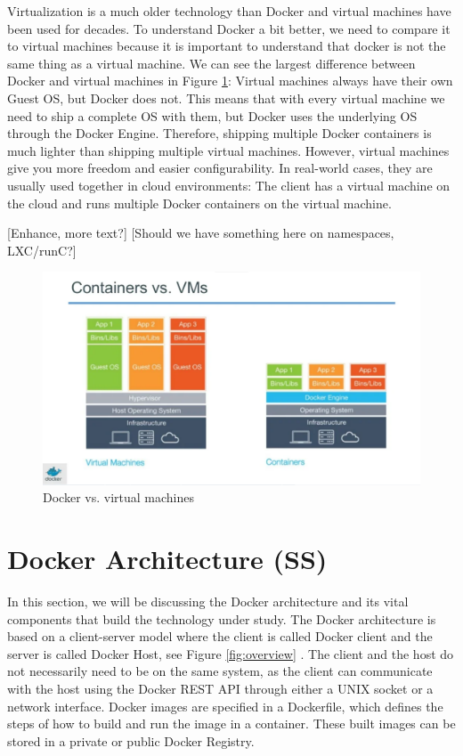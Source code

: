 \documentclass[fleqn,12pt]{olplainarticle}
\begin{document}
Virtualization is a much older technology than Docker and virtual machines have been used for decades. To understand Docker a bit better, we need to compare
it to virtual machines because it is important to understand that docker is not the same thing as a virtual machine. We can see the largest difference between Docker and virtual machines in Figure \ref{fig:dockervsvm}: Virtual machines always have their own Guest OS, but Docker does not. This means that with every virtual machine we need to ship a complete OS with them, but Docker uses the underlying OS through the Docker Engine. Therefore, shipping multiple Docker containers is much lighter than shipping multiple virtual machines. However, virtual machines give you more freedom and easier configurability. In real-world cases, they are usually used together in cloud environments: The client has a virtual machine on the cloud and runs multiple Docker containers on the virtual machine.

[Enhance, more text?]
[Should we have something here on namespaces, LXC/runC?]

\begin{figure}[h]
    \centering
    \includegraphics[width=1\textwidth]{docker_vs_vm.png}
    \caption{Docker vs. virtual machines \cite{docker:vs_vm}}
    \label{fig:dockervsvm}
\end{figure}

\section{Docker Architecture (SS)}

In this section, we will be discussing the Docker architecture and its vital components that build the technology under study. The Docker architecture is based on a client-server model where the client is called Docker client and the server is called Docker Host, see Figure \ref{fig:overview} \citep{docker:overview, aquasec:docker_architecture}. The client and the host do not necessarily need to be on the same system, as the client can communicate with the host using the Docker REST API through either a UNIX socket or a network interface. Docker images are specified in a Dockerfile, which defines the steps of how to build and run the image in a container. These built images can be stored in a private or public Docker Registry.
\end{document}

